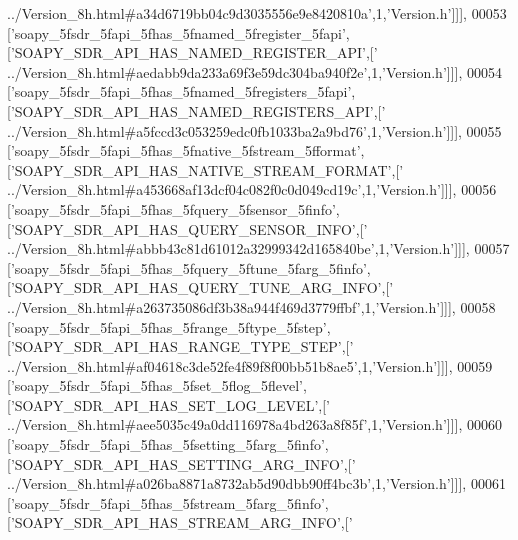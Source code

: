 \begin{DoxyCode}
{      ../Version\_8h.html#a34d6719bb04c9d3035556e9e8420810a'},1,\textcolor{stringliteral}{'Version.h'}]]],
00053   [\textcolor{stringliteral}{'soapy\_5fsdr\_5fapi\_5fhas\_5fnamed\_5fregister\_5fapi'},[\textcolor{stringliteral}{'SOAPY\_SDR\_API\_HAS\_NAMED\_REGISTER\_API'},[\textcolor{stringliteral}{'
      ../Version\_8h.html#aedabb9da233a69f3e59dc304ba940f2e'},1,\textcolor{stringliteral}{'Version.h'}]]],
00054   [\textcolor{stringliteral}{'soapy\_5fsdr\_5fapi\_5fhas\_5fnamed\_5fregisters\_5fapi'},[\textcolor{stringliteral}{'SOAPY\_SDR\_API\_HAS\_NAMED\_REGISTERS\_API'},[\textcolor{stringliteral}{'
      ../Version\_8h.html#a5fccd3c053259edc0fb1033ba2a9bd76'},1,\textcolor{stringliteral}{'Version.h'}]]],
00055   [\textcolor{stringliteral}{'soapy\_5fsdr\_5fapi\_5fhas\_5fnative\_5fstream\_5fformat'},[\textcolor{stringliteral}{'SOAPY\_SDR\_API\_HAS\_NATIVE\_STREAM\_FORMAT'},[\textcolor{stringliteral}{'
      ../Version\_8h.html#a453668af13dcf04c082f0c0d049cd19c'},1,\textcolor{stringliteral}{'Version.h'}]]],
00056   [\textcolor{stringliteral}{'soapy\_5fsdr\_5fapi\_5fhas\_5fquery\_5fsensor\_5finfo'},[\textcolor{stringliteral}{'SOAPY\_SDR\_API\_HAS\_QUERY\_SENSOR\_INFO'},[\textcolor{stringliteral}{'
      ../Version\_8h.html#abbb43c81d61012a32999342d165840be'},1,\textcolor{stringliteral}{'Version.h'}]]],
00057   [\textcolor{stringliteral}{'soapy\_5fsdr\_5fapi\_5fhas\_5fquery\_5ftune\_5farg\_5finfo'},[\textcolor{stringliteral}{'SOAPY\_SDR\_API\_HAS\_QUERY\_TUNE\_ARG\_INFO'},[\textcolor{stringliteral}{'
      ../Version\_8h.html#a263735086df3b38a944f469d3779ffbf'},1,\textcolor{stringliteral}{'Version.h'}]]],
00058   [\textcolor{stringliteral}{'soapy\_5fsdr\_5fapi\_5fhas\_5frange\_5ftype\_5fstep'},[\textcolor{stringliteral}{'SOAPY\_SDR\_API\_HAS\_RANGE\_TYPE\_STEP'},[\textcolor{stringliteral}{'
      ../Version\_8h.html#af04618c3de52fe4f89f8f00bb51b8ae5'},1,\textcolor{stringliteral}{'Version.h'}]]],
00059   [\textcolor{stringliteral}{'soapy\_5fsdr\_5fapi\_5fhas\_5fset\_5flog\_5flevel'},[\textcolor{stringliteral}{'SOAPY\_SDR\_API\_HAS\_SET\_LOG\_LEVEL'},[\textcolor{stringliteral}{'
      ../Version\_8h.html#aee5035c49a0dd116978a4bd263a8f85f'},1,\textcolor{stringliteral}{'Version.h'}]]],
00060   [\textcolor{stringliteral}{'soapy\_5fsdr\_5fapi\_5fhas\_5fsetting\_5farg\_5finfo'},[\textcolor{stringliteral}{'SOAPY\_SDR\_API\_HAS\_SETTING\_ARG\_INFO'},[\textcolor{stringliteral}{'
      ../Version\_8h.html#a026ba8871a8732ab5d90dbb90ff4bc3b'},1,\textcolor{stringliteral}{'Version.h'}]]],
00061   [\textcolor{stringliteral}{'soapy\_5fsdr\_5fapi\_5fhas\_5fstream\_5farg\_5finfo'},[\textcolor{stringliteral}{'SOAPY\_SDR\_API\_HAS\_STREAM\_ARG\_INFO'},[\textcolor{stringliteral}{'
}
\end{DoxyCode}
